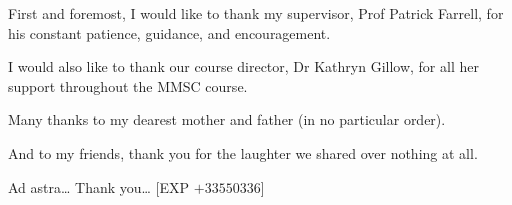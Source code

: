 \begin{acknowledgements} 

First and foremost, I would like to thank my supervisor, Prof Patrick Farrell, for his constant patience, guidance, and encouragement. 

I would also like to thank our course director, Dr Kathryn Gillow, for all her support throughout the MMSC course.

Many thanks to my dearest mother and father (in no particular order).

And to my friends, thank you for the laughter we shared over nothing at all.

Ad astra\dots{} Thank you\dots{} [EXP $+33550336$]

\end{acknowledgements}
